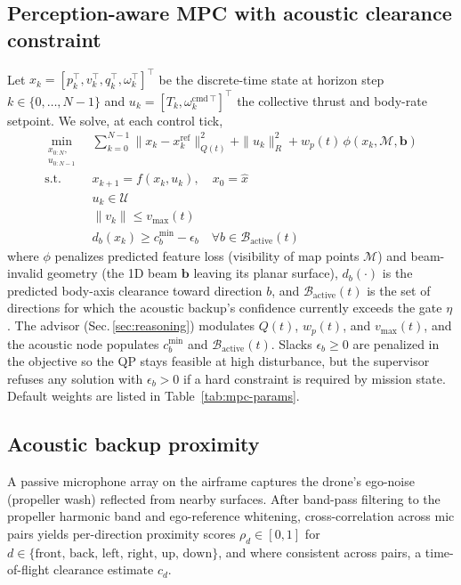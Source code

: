 \subsection{Perception-aware MPC with acoustic clearance constraint}
\label{sec:mpc}
Let $x_k = [p_k^\top, v_k^\top, q_k^\top, \omega_k^\top]^\top$ be the
discrete-time state at horizon step $k \in \{0, \dots, N-1\}$ and
$u_k = [T_k, \omega_k^{\text{cmd}\,\top}]^\top$ the collective thrust
and body-rate setpoint. We solve, at each control tick,
\begin{align}
\min_{\substack{x_{0:N},\\u_{0:N-1}}} \;& \sum_{k=0}^{N-1}
    \| x_k - x_k^{\text{ref}} \|_{Q(t)}^2
  + \| u_k \|_{R}^2
  + w_p(t)\,\phi(x_k, \mathcal{M}, \mathbf{b}) \nonumber\\
\text{s.t.}\;& x_{k+1} = f(x_k, u_k), \quad x_0 = \hat x \label{eq:dyn}\\
            & u_k \in \mathcal{U} \label{eq:input}\\
            & \|v_k\| \leq v_{\max}(t)               \label{eq:vmax}\\
            & d_b(x_k) \geq c^{\min}_b - \epsilon_b
              \quad \forall b\!\in\!\mathcal{B}_{\text{active}}(t)
              \label{eq:acoustic}
\end{align}
where $\phi$ penalizes predicted feature loss (visibility of map
points $\mathcal{M}$) and beam-invalid geometry (the 1D beam
$\mathbf{b}$ leaving its planar surface), $d_b(\cdot)$ is the
predicted body-axis clearance toward direction $b$, and
$\mathcal{B}_{\text{active}}(t)$ is the set of directions for which
the acoustic backup's confidence currently exceeds the gate
$\eta$. The advisor (Sec.\,\ref{sec:reasoning}) modulates $Q(t)$,
$w_p(t)$, and $v_{\max}(t)$, and the acoustic node populates $c^{\min}_b$
and $\mathcal{B}_{\text{active}}(t)$. Slacks $\epsilon_b \geq 0$ are
penalized in the objective so the QP stays feasible at high
disturbance, but the supervisor refuses any solution with
$\epsilon_b > 0$ if a hard constraint is required by mission state.
Default weights are listed in Table~\ref{tab:mpc-params}.

\subsection{Acoustic backup proximity}
A passive microphone array on the airframe captures the drone's
ego-noise (propeller wash) reflected from nearby surfaces. After
band-pass filtering to the propeller harmonic band and ego-reference
whitening, cross-correlation across mic pairs yields per-direction
proximity scores $\rho_d \in [0,1]$ for $d \in \{\text{front, back,
left, right, up, down}\}$, and where consistent across pairs, a
time-of-flight clearance estimate $c_d$.

